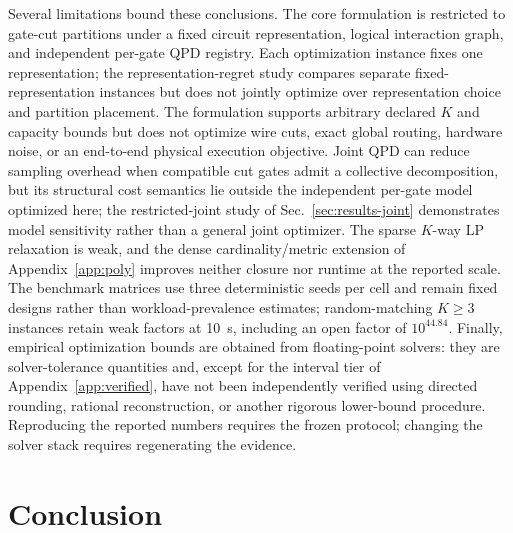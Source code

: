 \documentclass[
  aps,
  pra,
  reprint,
  amsmath,
  amssymb,
  longbibliography,
  nofootinbib,
  floatfix
]{revtex4-2}
\theoremstyle{plain}
\begin{document}
Several limitations bound these conclusions. The core formulation is restricted to gate-cut partitions under a fixed circuit representation, logical interaction graph, and independent per-gate QPD registry. Each optimization instance fixes one representation; the representation-regret study compares separate fixed-representation instances but does not jointly optimize over representation choice and partition placement. The formulation supports arbitrary declared $K$ and capacity bounds but does not optimize wire cuts, exact global routing, hardware noise, or an end-to-end physical execution objective. Joint QPD can reduce sampling overhead when compatible cut gates admit a collective decomposition, but its structural cost semantics lie outside the independent per-gate model optimized here; the restricted-joint study of Sec.~\ref{sec:results-joint} demonstrates model sensitivity rather than a general joint optimizer. The sparse $K$-way LP relaxation is weak, and the dense cardinality/metric extension of Appendix~\ref{app:poly} improves neither closure nor runtime at the reported scale. The benchmark matrices use three deterministic seeds per cell and remain fixed designs rather than workload-prevalence estimates; random-matching $K\geq3$ instances retain weak factors at 10~s, including an open factor of $10^{44.84}$. Finally, empirical optimization bounds are obtained from floating-point solvers: they are solver-tolerance quantities and, except for the interval tier of Appendix~\ref{app:verified}, have not been independently verified using directed rounding, rational reconstruction, or another rigorous lower-bound procedure. Reproducing the reported numbers requires the frozen protocol; changing the solver stack requires regenerating the evidence.

\section{Conclusion}
\label{sec:conclusion}
\end{document}
